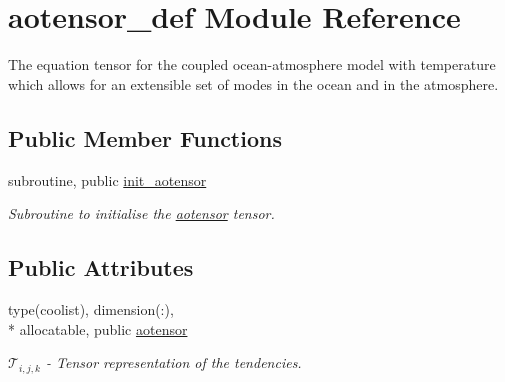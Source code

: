 \hypertarget{classaotensor__def}{\section{aotensor\-\_\-def Module Reference}
\label{classaotensor__def}
}


The equation tensor for the coupled ocean-\/atmosphere model with temperature which allows for an extensible set of modes in the ocean and in the atmosphere.  


\subsection*{Public Member Functions}
\begin{DoxyCompactItemize}
\item 
subroutine, public \hyperlink{classaotensor__def_ac2d5a88885d06f6dc047bee3a4ab427a}{init\-\_\-aotensor}
\begin{DoxyCompactList}\small\item\em Subroutine to initialise the \hyperlink{classaotensor__def_a0dc43bc9294a18f2fe57b67489f1702f}{aotensor} tensor. \end{DoxyCompactList}\end{DoxyCompactItemize}
\subsection*{Public Attributes}
\begin{DoxyCompactItemize}
\item 
type(coolist), dimension(\-:), \\*
allocatable, public \hyperlink{classaotensor__def_a0dc43bc9294a18f2fe57b67489f1702f}{aotensor}
\begin{DoxyCompactList}\small\item\em $\mathcal{T}_{i,j,k}$ -\/ Tensor representation of the tendencies. \end{DoxyCompactList}\end{DoxyCompactItemize}
